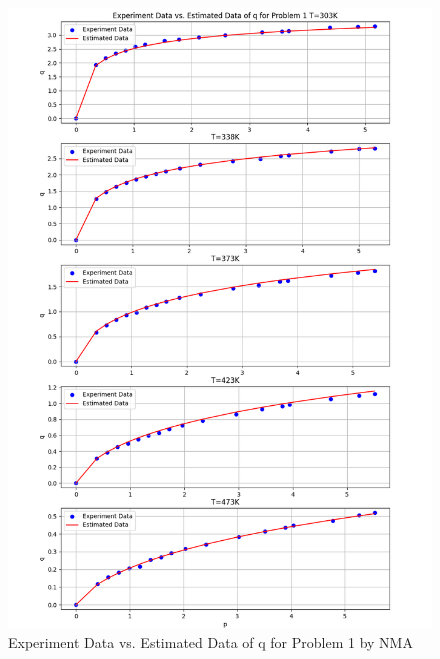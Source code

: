 \documentclass[12pt]{article} %
\begin{document}
\begin{figure}[ht]
    \centering
    \includegraphics[width=1\textwidth]{Q1_NMA_comp.png}
    \caption{Experiment Data vs. Estimated Data of q for Problem 1 by NMA}
\end{figure}


\clearpage
\end{document}
